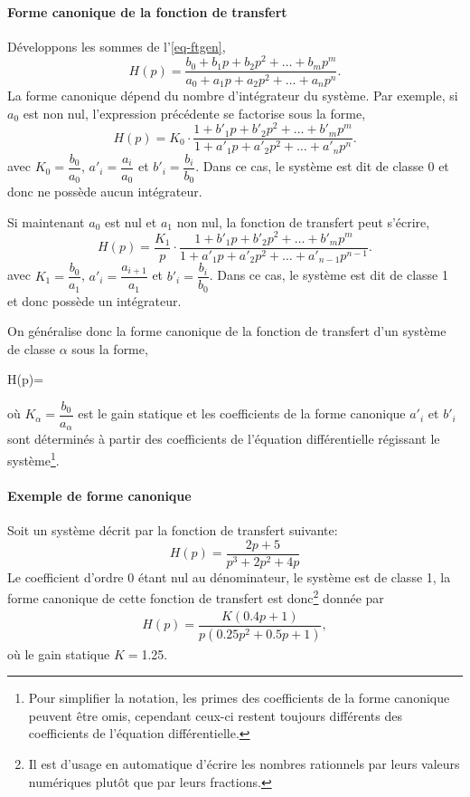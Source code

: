 \paragraph{Forme canonique de la fonction de transfert}
Développons les sommes de l'\cref{eq-ftgen},
$$
H(p)=\dfrac{b_0+b_1p+b_2p^2+\ldots+b_mp^m}{a_0+a_1p+a_2p^2+\ldots+a_np^n}.
$$
La forme canonique dépend du nombre d'intégrateur du système. 
Par exemple, si $a_0$ est non nul, l'expression précédente se factorise sous la forme,
$$
H(p)=K_0\cdot\dfrac{1+b'_1p+b'_2p^2+\ldots+b'_mp^m}{1+a'_1p+a'_2p^2+\ldots+a'_np^n}.
$$
avec $K_0=\dfrac{b_0}{a_0}$, $a'_i=\dfrac{a_i}{a_0}$ et $b'_i=\dfrac{b_i}{b_0}$. 
Dans ce cas, le système est dit de classe 0 et donc ne possède aucun intégrateur.

Si maintenant $a_0$ est nul et $a_1$ non nul, la fonction de transfert peut s'écrire,
$$
H(p)=\dfrac{K_1}{p}\cdot\dfrac{1+b'_1p+b'_2p^2+\ldots+b'_mp^m}{1+a'_1p+a'_2p^2+\ldots+a'_{n-1}p^{n-1}}.
$$
avec $K_1=\dfrac{b_0}{a_1}$, $a'_i=\dfrac{a_{i+1}}{a_1}$ et $b'_i=\dfrac{b_i}{b_0}$.
Dans ce cas, le système est dit de classe 1 et donc possède un intégrateur.

On généralise donc la forme canonique de la fonction de transfert d'un système de classe $\alpha$ sous la forme,
\begin{bequation}
H(p)=\cdot{} \label{eq-ftcan} 
\end{bequation}
où $K_\alpha=\dfrac{b_0}{a_\alpha}$ est le gain statique et les coefficients de 
la forme canonique $a'_i$ et $b'_i$ sont déterminés à partir des coefficients 
de l'équation différentielle régissant le système\footnote{Pour simplifier la notation, 
les primes des coefficients de la forme canonique peuvent être omis, cependant 
ceux-ci restent toujours différents des coefficients de l'équation différentielle.}.

\paragraph{Exemple de forme canonique}
Soit un système décrit par la fonction de transfert suivante:
$$
H(p)=\dfrac{2p+5}{p^3+2p^2+4p}
$$
Le coefficient d'ordre 0 étant nul au dénominateur, le système est de classe 1, 
la forme canonique de cette fonction de transfert est 
donc\footnote{Il est d'usage en automatique d'écrire les nombres rationnels 
par leurs valeurs numériques plutôt que par leurs fractions. } donnée par
\begin{align*}
H(p)=\dfrac{K(0.4p+1)}{p(0.25p^2+0.5p+1)},
\end{align*}
où le gain statique $K=$1.25.

